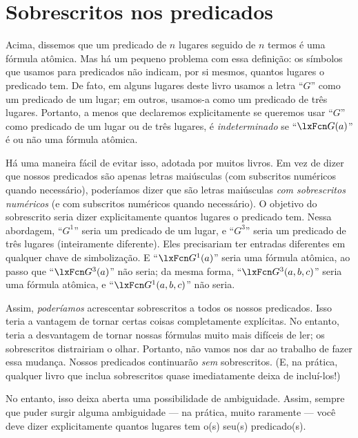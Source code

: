 \section{Sobrescritos nos predicados}
Acima, dissemos que um predicado de $n$ lugares seguido de $n$ termos é uma fórmula atômica. Mas há um pequeno problema com essa definição: os símbolos que usamos para predicados não indicam, por si mesmos, quantos lugares o predicado tem. De fato, em alguns lugares deste livro usamos a letra \textquotedblleft $G$\textquotedblright{} como um predicado de um lugar; em outros, usamos-a como um predicado de três lugares. Portanto, a menos que declaremos explicitamente se queremos usar \textquotedblleft $G$\textquotedblright{} como predicado de um lugar ou de três lugares, é \emph{indeterminado} se \textquotedblleft $\atom{G}{a}$\textquotedblright{} é ou não uma fórmula atômica.

Há uma maneira fácil de evitar isso, adotada por muitos livros. Em vez de dizer que nossos predicados são apenas letras maiúsculas (com subscritos numéricos quando necessário), poderíamos dizer que são letras maiúsculas \emph{com sobrescritos numéricos} (e com subscritos numéricos quando necessário). O objetivo do sobrescrito seria dizer explicitamente quantos lugares o predicado tem. Nessa abordagem, \textquotedblleft $G^1$\textquotedblright{} seria um predicado de um lugar, e \textquotedblleft $G^3$\textquotedblright{} seria um predicado de três lugares (inteiramente diferente). Eles precisariam ter entradas diferentes em qualquer chave de simbolização. E \textquotedblleft $\atom{G^1}{a}$\textquotedblright{} seria uma fórmula atômica, ao passo que \textquotedblleft $\atom{G^3}{a}$\textquotedblright{} não seria; da mesma forma, \textquotedblleft $\atom{G^3}{a,b,c}$\textquotedblright{} seria uma fórmula atômica, e \textquotedblleft $\atom{G^1}{a,b,c}$\textquotedblright{} não seria.

Assim, \emph{poderíamos} acrescentar sobrescritos a todos os nossos predicados. Isso teria a vantagem de tornar certas coisas completamente explícitas. No entanto, teria a desvantagem de tornar nossas fórmulas muito mais difíceis de ler; os sobrescritos distrairiam o olhar. Portanto, não vamos nos dar ao trabalho de fazer essa mudança. Nossos predicados continuarão \emph{sem} sobrescritos. (E, na prática, qualquer livro que inclua sobrescritos quase imediatamente deixa de incluí-los!)

No entanto, isso deixa aberta uma possibilidade de ambiguidade. Assim, sempre que puder surgir alguma ambiguidade — na prática, muito raramente — você deve dizer explicitamente quantos lugares tem o(s) seu(s) predicado(s).

